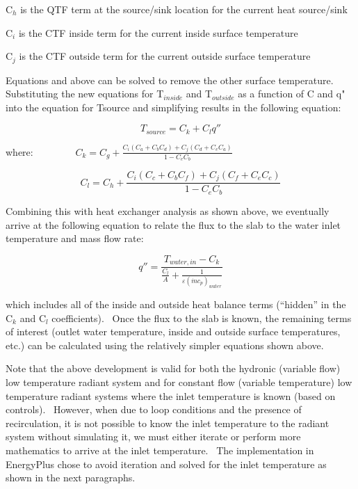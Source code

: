 C\(_{h}\) is the QTF term at the source/sink location for the current heat source/sink

C\(_{i}\) is the CTF inside term for the current inside surface temperature

C\(_{j}\) is the CTF outside term for the current outside surface temperature

Equations and above can be solved to remove the other surface temperature. Substituting the new equations for T\(_{inside}\) and T\(_{outside}\) as a function of C and q" into the equation for Tsource and simplifying results in the following equation:

\begin{equation}
{T_{source}} = {C_k} + {C_l}q''
\end{equation}

where:~~~~~~~~ \({C_k} = {C_g} + \frac{{{C_i}\left( {{C_a} + {C_b}{C_d}} \right) + {C_j}\left( {{C_d} + {C_e}{C_a}} \right)}}{{1 - {C_e}{C_b}}}\)

\begin{equation}
{C_l} = {C_h} + \frac{{{C_i}\left( {{C_c} + {C_b}{C_f}} \right) + {C_j}\left( {{C_f} + {C_e}{C_c}} \right)}}{{1 - {C_e}{C_b}}}
\end{equation}

Combining this with heat exchanger analysis as shown above, we eventually arrive at the following equation to relate the flux to the slab to the water inlet temperature and mass flow rate:

\begin{equation}
q'' = \frac{{{T_{water,in}} - {C_k}}}{{\frac{{{C_l}}}{A} + \frac{1}{{\varepsilon {{\left( {\dot m{c_p}} \right)}_{water}}}}}}
\end{equation}

which includes all of the inside and outside heat balance terms (``hidden'' in the C\(_{k}\) and C\(_{l}\) coefficients).~ Once the flux to the slab is known, the remaining terms of interest (outlet water temperature, inside and outside surface temperatures, etc.) can be calculated using the relatively simpler equations shown above.

Note that the above development is valid for both the hydronic (variable flow) low temperature radiant system and for constant flow (variable temperature) low temperature radiant systems where the inlet temperature is known (based on controls).~ However, when due to loop conditions and the presence of recirculation, it is not possible to know the inlet temperature to the radiant system without simulating it, we must either iterate or perform more mathematics to arrive at the inlet temperature.~ The implementation in EnergyPlus chose to avoid iteration and solved for the inlet temperature as shown in the next paragraphs.

